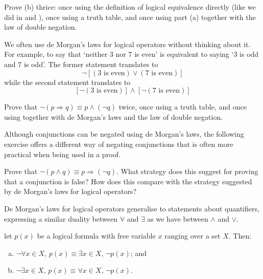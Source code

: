 \begin{exercise}
Prove (b) thrice: once using the definition of logical equivalence directly (like we did in  and ), once using a truth table, and once using part (a) together with the law of double negation.
\end{exercise}

\begin{example}
We often use de Morgan's laws for logical operators without thinking about it. For example, to say that `neither $3$ nor $7$ is even' is equivalent to saying `$3$ is odd and $7$ is odd'. The former statement translates to
\[ \neg [(3 \text{ is even}) \vee (7 \text{ is even})]\]
while the second statement translates to
\[ [\neg (3 \text{ is even})] \wedge [\neg (7 \text{ is even})]\]
\end{example}

\begin{exercise}
\label{exNegationOfImplication}
Prove that $\neg (p \Rightarrow q) \equiv p \wedge (\neg q)$ twice, once using a truth table, and once using  together with de Morgan's laws and the law of double negation.
\end{exercise}

Although conjunctions can be negated using de Morgan's laws, the following exercise offers a different way of negating conjunctions that is often more practical when being used in a proof.

\begin{exercise}
\label{exNegationOfConjunctionAlternative}
Prove that $\neg (p \wedge q) \equiv p \Rightarrow (\neg q)$. What strategy does this suggest for proving that a conjunction is false? How does this compare with the strategy suggested by de Morgan's laws for logical operators?
\end{exercise}

De Morgan's laws for logical operators generalise to statements about quantifiers, expressing a similar duality between $\forall$ and $\exists$ as we have between $\wedge$ and $\vee$.

\begin{theorem}
\label{thmDeMorganQuantifiers}
let $p(x)$ be a logical formula with free variable $x$ ranging over a set $X$. Then:
\begin{enumerate}[(a)]
\item $\neg \forall x \in X,\, p(x) \equiv \exists x \in X,\, \neg p(x)$; and
\item $\neg \exists x \in X,\, p(x) \equiv \forall x \in X,\, \neg p(x)$.
\end{enumerate}
\end{theorem}

